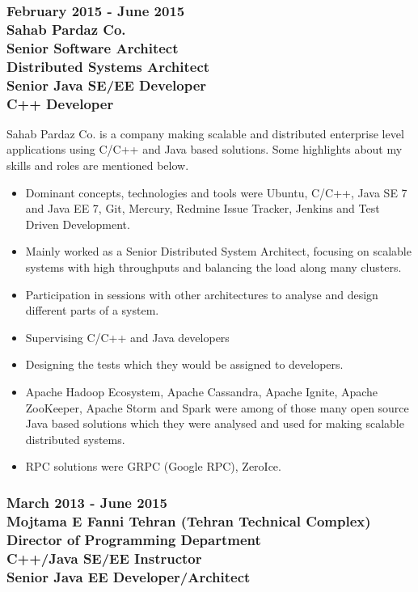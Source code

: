 \documentclass[10pt,a4paper]{article}
\begin{document}
\subsubsection{\textnormal {February 2015 - June 2015} \\ \textnormal {Sahab Pardaz Co.} \\ Senior Software Architect \\ Distributed Systems Architect \\ Senior Java SE/EE Developer \\ C++ Developer}
	\setlength{\leftskip}{0.5cm}
  \setlength{\rightskip}{1cm}
  Sahab Pardaz Co. is a company making scalable and distributed enterprise level applications using C/C++ and Java based solutions. Some highlights about my skills and roles are mentioned below.
  \begin{itemize}
    \setlength{\rightskip}{2cm}
    \setlength\itemsep{0em}
    \item Dominant concepts, technologies and tools were Ubuntu, C/C++, Java SE 7 and Java EE 7, Git, Mercury, Redmine Issue Tracker, Jenkins and Test Driven Development.
    \item Mainly worked as a Senior Distributed System Architect, focusing on scalable systems with high throughputs and balancing the load along many clusters.
    \item Participation in sessions with other architectures to analyse and design different parts of a system.
    \item Supervising C/C++ and Java developers
    \item Designing the tests which they would be assigned to developers.
    \item Apache Hadoop Ecosystem, Apache Cassandra, Apache Ignite, Apache ZooKeeper, Apache Storm and Spark were among of those many open source Java based solutions which they were analysed and used for making scalable distributed systems.
    \item RPC solutions were GRPC (Google RPC), ZeroIce.
  \end{itemize}
  \setlength{\leftskip}{0pt}
  \setlength{\rightskip}{0cm}
	  
\subsubsection{\textnormal {March 2013 - June 2015} \\ \textnormal {Mojtama E Fanni Tehran (Tehran Technical Complex)} \\ Director of Programming Department \\ C++/Java SE/EE Instructor \\ Senior Java EE Developer/Architect}
  \setlength{\leftskip}{0.5cm}
  \setlength{\rightskip}{1cm}
  \lipsum[2]
  \setlength{\leftskip}{0pt}
  \setlength{\rightskip}{0cm}
	  
\end{document}
